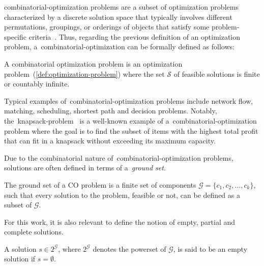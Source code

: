 \acrfull{combinatorial-optimization} problems are a subset of optimization
problems characterized by a discrete solution space that typically involves
different permutations, groupings, or orderings of objects that satisfy some
problem-specific
criteria~\cite{papadimitriou1998combinatorial,vieira2009uma,blum2003metaheuristics,yu2010combinatorial}.
Thus, regarding the previous definition of an optimization problem,
a~\acrshort{combinatorial-optimization} can be formally defined as follows:

\begin{definition}
  \label{def:combinatorial-optimization-problem}
  A combinatorial optimization problem is an optimization
  problem~(\ref{def:optimization-problem}) where the set $\mathcal{S}$ of
  feasible solutions is finite or countably infinite.
\end{definition}

Typical examples of~\acrshort{combinatorial-optimization} problems include
network flow, matching, scheduling, shortest path and decision problems.
Notably, the~\acrfull{knapsack-problem}~\cite{cacchiani2022knapsack,
  yu2010combinatorial,festa2014brief} is a well-known example of
a~\acrshort{combinatorial-optimization} problem where the goal is to find the
subset of items with the highest total profit that can fit in a knapsack without
exceeding its maximum capacity.

Due to the combinatorial nature of~\acrshort{combinatorial-optimization}
problems, solutions are often defined in terms of a~\emph{ground set}.

\begin{definition}
  The ground set of a CO problem is a finite set of
  components $\mathcal{G} = \{c_1, c_2, \ldots, c_k\}$, such that every solution to the
  problem, feasible or not, can be defined as a subset of $\mathcal{G}$.  \end{definition}

For this work, it is also relevant to define the notion of empty, partial and
complete solutions.

\begin{definition}
  \label{def:empty-solution}
  A solution $s \in 2^\mathcal{G}$, where $2^\mathcal{G}$ denotes the powerset of $\mathcal{G}$,
  is said to be an empty solution if $s = \emptyset$.
\end{definition}

